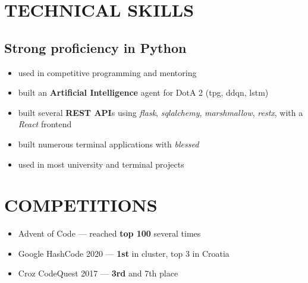 \documentclass{article}
\begin{document}
\section{TECHNICAL SKILLS}
\subsection{Strong proficiency in Python}
\begin{itemize}
  \itemsep0em
  \item used in competitive programming and mentoring
  \item built an {\bfseries Artificial Intelligence} agent for DotA 2 (tpg, ddqn, lstm)
  \item built several {\bfseries REST API}s using \textit{flask}, \textit{sqlalchemy}, \textit{marshmallow}, \textit{restx}, with a \textit{React} frontend
  \item built numerous terminal applications with \textit{blessed}
  \item used in most university and terminal projects
\end{itemize}



\section{COMPETITIONS}
\begin{itemize}
  \itemsep0em
  \item Advent of Code --- reached {\bfseries top 100} several times
  \item Google HashCode 2020 --- {\bfseries 1st} in cluster, top 3 in Croatia
  \item Croz CodeQuest 2017 --- {\bfseries 3rd} and 7th place
\end{itemize}
\end{document}

